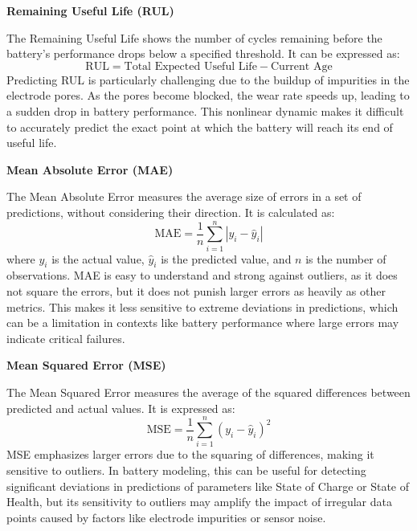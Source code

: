 \vspace{1cm}
\textbf{Remaining Useful Life (RUL)}

The Remaining Useful Life shows the number of cycles remaining before the battery's performance drops below a specified threshold. It can be expressed as:
\begin{equation}
\text{RUL} = \text{Total Expected Useful Life} - \text{Current Age}
\end{equation}
Predicting RUL is particularly challenging due to the buildup of impurities in the electrode pores. As the pores become blocked, the wear rate speeds up, leading to a sudden drop in battery performance. This nonlinear dynamic makes it difficult to accurately predict the exact point at which the battery will reach its end of useful life.
\vspace{1cm}

\textbf{Mean Absolute Error (MAE)}

The Mean Absolute Error measures the average size of errors in a set of predictions, without considering their direction. It is calculated as:
\begin{equation}
\text{MAE} = \frac{1}{n} \sum_{i=1}^{n} |y_i - \hat{y}_i|
\end{equation}
where $y_i$ is the actual value, $\hat{y}_i$ is the predicted value, and $n$ is the number of observations. MAE is easy to understand and strong against outliers, as it does not square the errors, but it does not punish larger errors as heavily as other metrics. This makes it less sensitive to extreme deviations in predictions, which can be a limitation in contexts like battery performance where large errors may indicate critical failures.

\vspace{1cm}
\textbf{Mean Squared Error (MSE)}

The Mean Squared Error measures the average of the squared differences between predicted and actual values. It is expressed as:
\begin{equation}
\text{MSE} = \frac{1}{n} \sum_{i=1}^{n} (y_i - \hat{y}_i)^2
\end{equation}
MSE emphasizes larger errors due to the squaring of differences, making it sensitive to outliers. In battery modeling, this can be useful for detecting significant deviations in predictions of parameters like State of Charge or State of Health, but its sensitivity to outliers may amplify the impact of irregular data points caused by factors like electrode impurities or sensor noise.


